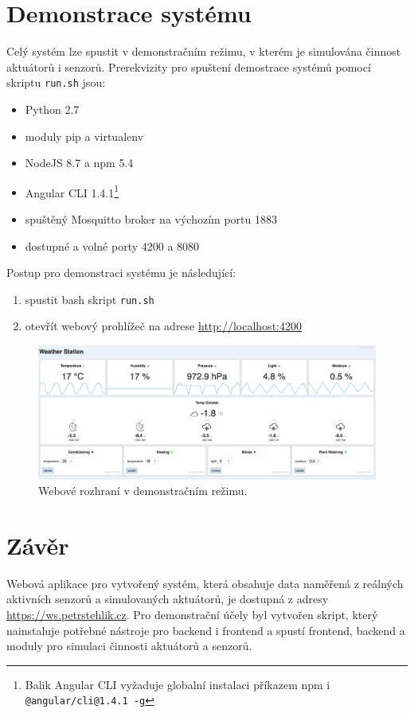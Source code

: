 \documentclass[11pt,a4paper]{article}
\begin{document}
\section{Demonstrace systému}\label{sec:res}
Celý systém lze spustit v demonstračním režimu, v kterém je simulována činnost aktuátorů i senzorů. Prerekvizity pro spuštení demostrace systémů pomocí skriptu \texttt{run.sh} jsou:
\begin{itemize}
    \item Python 2.7
    \item moduly pip a virtualenv
    \item NodeJS 8.7 a npm 5.4
    \item Angular CLI 1.4.1\footnote{Balik Angular CLI vyžaduje globalní instalaci příkazem npm i \texttt{@angular/cli@1.4.1 -g}}
    \item spuštěný Mosquitto broker na výchozím portu 1883
    \item dostupné a volné porty 4200 a 8080
\end{itemize}
Postup pro demonstraci systému je následující:
\begin{enumerate}
    \item spustit bash skript \texttt{run.sh}
    \item otevřít webový prohlížeč na adrese \url{http://localhost:4200}
\end{enumerate}

\begin{figure}[htb]
    \centering
    \includegraphics[width=0.75\linewidth]{web}
    \caption{Webové rozhraní v demonstračním režimu.}
    \label{fig:web}
\end{figure}

\section{Závěr}\label{sec:sum}
Webová aplikace pro vytvořený systém, která obsahuje data naměřená z reálných aktivních senzorů a simulovaných aktuátorů, je dostupná z adresy \url{https://ws.petrstehlik.cz}. Pro demonstrační účely byl vytvořen skript, který nainstaluje potřebné nástroje pro backend i frontend a spustí frontend, backend a moduly pro simulaci činnosti aktuátorů a senzorů.
\end{document}
